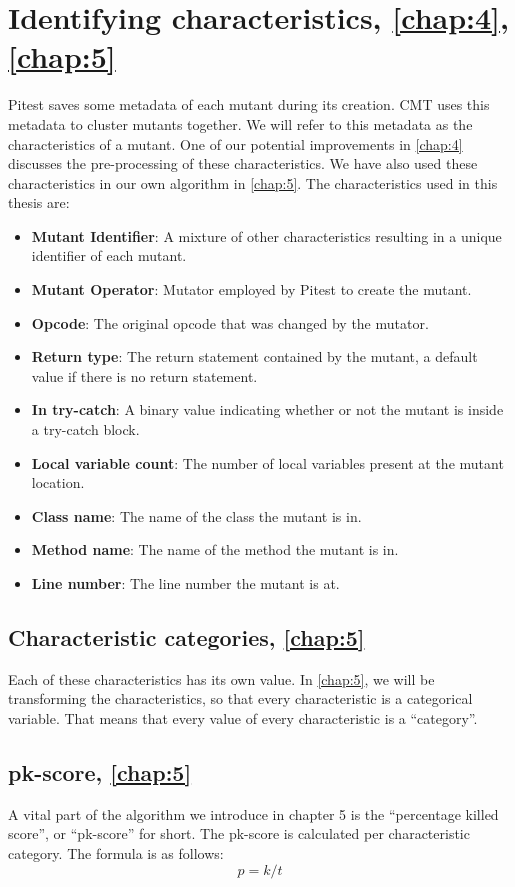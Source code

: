 \documentclass[twoside]{uva-inf-bachelor-thesis}
\begin{document}
\section{Identifying characteristics, \textbf{\cref{chap:4}, \cref{chap:5}}}
Pitest saves some metadata of each mutant during its creation. CMT uses this metadata to cluster mutants together. We will refer to this metadata as the characteristics of a mutant. One of our potential improvements in \cref{chap:4} discusses the pre-processing of these characteristics. We have also used these characteristics in our own algorithm in \cref{chap:5}. The characteristics used in this thesis are:
\begin{itemize}
    \item \textbf{Mutant Identifier}: A mixture of other characteristics resulting in a unique identifier of each mutant.
    \item \textbf{Mutant Operator}: Mutator employed by Pitest to create the mutant.
    \item \textbf{Opcode}: The original opcode that was changed by the mutator.
    \item \textbf{Return type}: The return statement contained by the mutant, a default value if there is no return statement.
    \item \textbf{In try-catch}: A binary value indicating whether or not the mutant is inside a try-catch block. 
    \item \textbf{Local variable count}: The number of local variables present at the mutant location.
    \item \textbf{Class name}: The name of the class the mutant is in.
    \item \textbf{Method name}: The name of the method the mutant is in.
    \item \textbf{Line number}: The line number the mutant is at.
\end{itemize}

\subsection{Characteristic categories, \textbf{\cref{chap:5}}}
Each of these characteristics has its own value. In \cref{chap:5}, we will be transforming the characteristics, so that every characteristic is a categorical variable. That means that every value of every characteristic is a ``category''.

\subsection{pk-score, \textbf{\cref{chap:5}}}
A vital part of the algorithm we introduce in chapter 5 is the ``percentage killed score'', or ``pk-score'' for short. The pk-score is calculated per characteristic category. The formula is as follows:
 \[p = k/t\]
\end{document}
